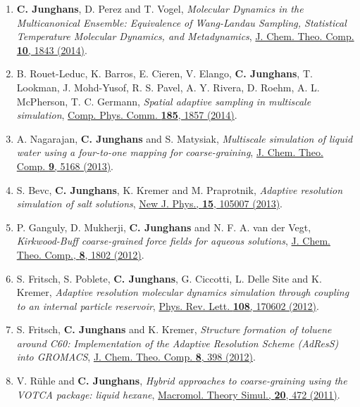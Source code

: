 \documentclass{article}
\begin{document}
\begin{enumerate}
\item[19.] \textbf{C. Junghans}, D. Perez and T. Vogel,
  \textit{Molecular Dynamics in the Multicanonical Ensemble: Equivalence of Wang-Landau Sampling, Statistical Temperature Molecular Dynamics, and Metadynamics},
  \href{http://dx.doi.org/10.1021/ct500077d}{J. Chem. Theo. Comp. \textbf{10}, 1843 (2014)}.

\item[18.] B. Rouet-Leduc, K. Barros, E. Cieren, V. Elango, \textbf{C. Junghans}, T. Lookman, J. Mohd-Yusof, R. S. Pavel, A. Y. Rivera, D. Roehm, A. L. McPherson, T. C. Germann,
  \textit{Spatial adaptive sampling in multiscale simulation},
  \href{http://dx.doi.org/10.1016/j.cpc.2014.03.011}{Comp. Phys. Comm.  \textbf{185}, 1857 (2014)}.

\item[17.] A. Nagarajan, \textbf{C. Junghans} and S. Matysiak,
  \textit{Multiscale simulation of liquid water using a four-to-one mapping for coarse-graining},
  \href{http://dx.doi.org/10.1021/ct400566j}{J. Chem. Theo. Comp. \textbf{9}, 5168 (2013)}.

\item[16.] S. Bevc, \textbf{C. Junghans}, K. Kremer and M. Praprotnik,
  \textit{Adaptive resolution simulation of salt solutions},
  \href{http://dx.doi.org/10.1088/1367-2630/15/10/105007}{New J. Phys., \textbf{15}, 105007 (2013)}.

\item[15.] P. Ganguly, D. Mukherji, \textbf{C. Junghans} and N. F. A. van der Vegt,
  \textit{Kirkwood-Buff coarse-grained force fields for aqueous solutions},
  \href{http://dx.doi.org/10.1021/ct3000958}{J. Chem. Theo. Comp., \textbf{8}, 1802 (2012)}.

\item[14.] S. Fritsch, S. Poblete, \textbf{C. Junghans}, G. Ciccotti, L. Delle Site and K. Kremer,
  \textit{Adaptive resolution molecular dynamics simulation through coupling to an internal particle reservoir},
  \href{http://dx.doi.org/10.1103/PhysRevLett.108.170602}{Phys. Rev. Lett. \textbf{108}, 170602 (2012)}.

\item[13.] S. Fritsch, \textbf{C. Junghans} and K. Kremer,
  \textit{Structure formation of toluene around C60: Implementation of the Adaptive Resolution Scheme (AdResS) into GROMACS},
  \href{http://dx.doi.org/10.1021/ct200706f}{J. Chem. Theo. Comp. \textbf{8}, 398 (2012)}.

\item[12.] V. R{\"u}hle and \textbf{C. Junghans},
  \textit{Hybrid approaches to coarse-graining using the VOTCA package: liquid hexane},
  \href{http://dx.doi.org/10.1002/mats.201100011}{Macromol. Theory Simul., \textbf{20}, 472 (2011)}.


\end{enumerate}
\end{document}
